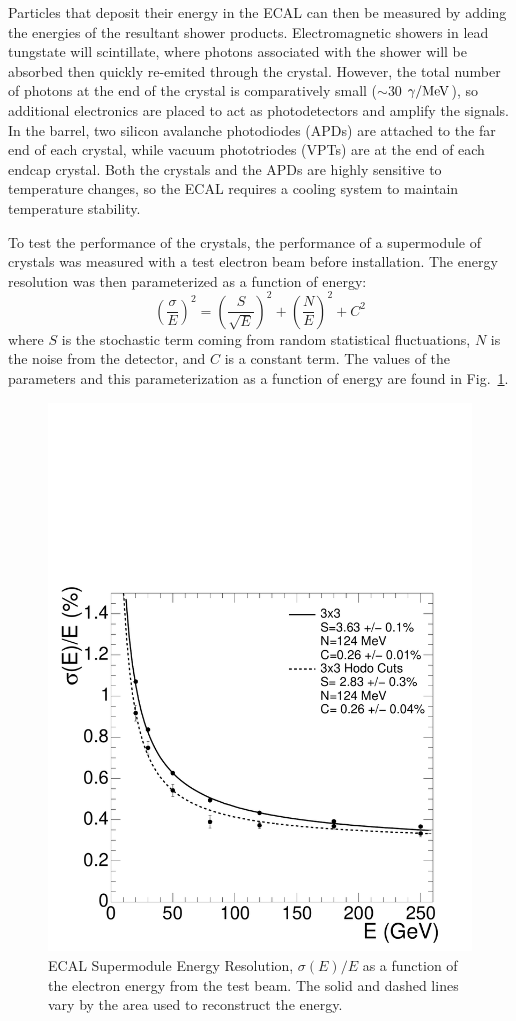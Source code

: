 Particles that deposit their energy in the ECAL can then be measured by adding the energies of the resultant shower products. Electromagnetic showers in lead tungstate will scintillate, where photons associated with the shower will be absorbed then quickly re-emited through the crystal. However, the total number of photons at the end of the crystal is comparatively small ($\sim30$ $\gamma/\rm{MeV}$), so additional electronics are placed to act as photodetectors and amplify the signals. In the barrel, two silicon avalanche photodiodes (APDs) are attached to the far end of each crystal, while vacuum phototriodes (VPTs) are at the end of each endcap crystal. Both the crystals and the APDs are highly sensitive to temperature changes, so the ECAL requires a cooling system to maintain temperature stability. 

To test the performance of the crystals, the performance of a supermodule of crystals was measured with a test electron beam before installation. The energy resolution was then parameterized as a function of energy:
\begin{equation}
\left(\frac{\sigma}{E}\right)^2 = \left(\frac{S}{\sqrt{E}}\right)^2 + \left(\frac{N}{E}\right)^2 + C^2
\end{equation}
where $S$ is the stochastic term coming from random statistical fluctuations, $N$ is the noise from the detector, and $C$ is a constant term. The values of the parameters and this parameterization as a function of energy are found in Fig.~\ref{fig:ECALResolution}.

\begin{figure}[htbp]
\begin{center}
\includegraphics[width=.7\linewidth]{Experiment/figures/ECALResolution.pdf}
\caption[Resolution of the Electromagnetic Calorimeter as a Function of Energy]{ECAL Supermodule Energy Resolution, $\sigma(E)/E$ as a function of the electron energy from the test beam. The solid and dashed lines vary by the area used to reconstruct the energy.}
\label{fig:ECALResolution}
\end{center}
\end{figure}

